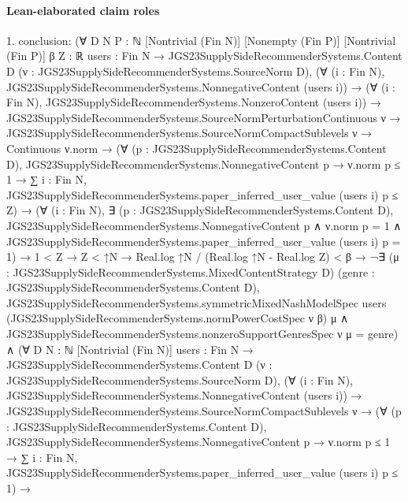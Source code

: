 \documentclass[10pt]{article}
\begin{document}
\paragraph{Lean-elaborated claim roles}\begin{ReviewVerbatim}
1. conclusion: (∀ {D N P : ℕ} [Nontrivial (Fin N)] [Nonempty (Fin P)] [Nontrivial (Fin P)] {β Z : ℝ}
    {users : Fin N → JGS23SupplySideRecommenderSystems.Content D} (ν : JGS23SupplySideRecommenderSystems.SourceNorm D),
    (∀ (i : Fin N), JGS23SupplySideRecommenderSystems.NonnegativeContent (users i)) →
      (∀ (i : Fin N), JGS23SupplySideRecommenderSystems.NonzeroContent (users i)) →
        JGS23SupplySideRecommenderSystems.SourceNormPerturbationContinuous ν →
          JGS23SupplySideRecommenderSystems.SourceNormCompactSublevels ν →
            Continuous ν.norm →
              (∀ (p : JGS23SupplySideRecommenderSystems.Content D),
                  JGS23SupplySideRecommenderSystems.NonnegativeContent p →
                    ν.norm p ≤ 1 →
                      ∑ i : Fin N, JGS23SupplySideRecommenderSystems.paper_inferred_user_value (users i) p ≤ Z) →
                (∀ (i : Fin N),
                    ∃ (p : JGS23SupplySideRecommenderSystems.Content D),
                      JGS23SupplySideRecommenderSystems.NonnegativeContent p ∧
                        ν.norm p = 1 ∧ JGS23SupplySideRecommenderSystems.paper_inferred_user_value (users i) p = 1) →
                  1 < Z →
                    Z < ↑N →
                      Real.log ↑N / (Real.log ↑N - Real.log Z) < β →
                        ¬∃ (μ : JGS23SupplySideRecommenderSystems.MixedContentStrategy D) (genre :
                            JGS23SupplySideRecommenderSystems.Content D),
                            JGS23SupplySideRecommenderSystems.symmetricMixedNashModelSpec users
                                (JGS23SupplySideRecommenderSystems.normPowerCostSpec ν β) μ ∧
                              JGS23SupplySideRecommenderSystems.nonzeroSupportGenresSpec ν μ = {genre}) ∧
  (∀ {D N : ℕ} [Nontrivial (Fin N)] {users : Fin N → JGS23SupplySideRecommenderSystems.Content D}
      (ν : JGS23SupplySideRecommenderSystems.SourceNorm D),
      (∀ (i : Fin N), JGS23SupplySideRecommenderSystems.NonnegativeContent (users i)) →
        JGS23SupplySideRecommenderSystems.SourceNormCompactSublevels ν →
          (∀ (p : JGS23SupplySideRecommenderSystems.Content D),
              JGS23SupplySideRecommenderSystems.NonnegativeContent p →
                ν.norm p ≤ 1 →
                  ∑ i : Fin N, JGS23SupplySideRecommenderSystems.paper_inferred_user_value (users i) p ≤ 1) →

\end{ReviewVerbatim}
\end{document}

